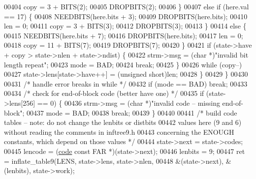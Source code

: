 \begin{DoxyCode}
{{{{{{{{00404                         copy = 3 + BITS(2);
00405                         DROPBITS(2);
00406                     \}
00407                     \textcolor{keywordflow}{else} \textcolor{keywordflow}{if} (here.val == 17) \{
00408                         NEEDBITS(here.bits + 3);
00409                         DROPBITS(here.bits);
00410                         len = 0;
00411                         copy = 3 + BITS(3);
00412                         DROPBITS(3);
00413                     \}
00414                     \textcolor{keywordflow}{else} \{
00415                         NEEDBITS(here.bits + 7);
00416                         DROPBITS(here.bits);
00417                         len = 0;
00418                         copy = 11 + BITS(7);
00419                         DROPBITS(7);
00420                     \}
00421                     \textcolor{keywordflow}{if} (state->have + copy > state->nlen + state->ndist) \{
00422                         strm->msg = (\textcolor{keywordtype}{char} *)\textcolor{stringliteral}{"invalid bit length repeat"};
00423                         mode = BAD;
00424                         \textcolor{keywordflow}{break};
00425                     \}
00426                     \textcolor{keywordflow}{while} (copy--)
00427                         state->lens[state->have++] = (\textcolor{keywordtype}{unsigned} short)len;
00428                 \}
00429             \}
00430 
00431             \textcolor{comment}{/* handle error breaks in while */}
00432             \textcolor{keywordflow}{if} (mode == BAD) \textcolor{keywordflow}{break};
00433 
00434             \textcolor{comment}{/* check for end-of-block code (better have one) */}
00435             \textcolor{keywordflow}{if} (state->lens[256] == 0) \{
00436                 strm->msg = (\textcolor{keywordtype}{char} *)\textcolor{stringliteral}{"invalid code -- missing end-of-block"};
00437                 mode = BAD;
00438                 \textcolor{keywordflow}{break};
00439             \}
00440 
00441             \textcolor{comment}{/* build code tables -- note: do not change the lenbits or distbits}
00442 \textcolor{comment}{               values here (9 and 6) without reading the comments in inftree9.h}
00443 \textcolor{comment}{               concerning the ENOUGH constants, which depend on those values */}
00444             state->next = state->codes;
00445             lencode = (\hyperlink{structcode}{code} \textcolor{keyword}{const} FAR *)(state->next);
00446             lenbits = 9;
00447             ret = inflate\_table9(LENS, state->lens, state->nlen,
00448                             &(state->next), &(lenbits), state->work);
}}}}}}}}
\end{DoxyCode}
